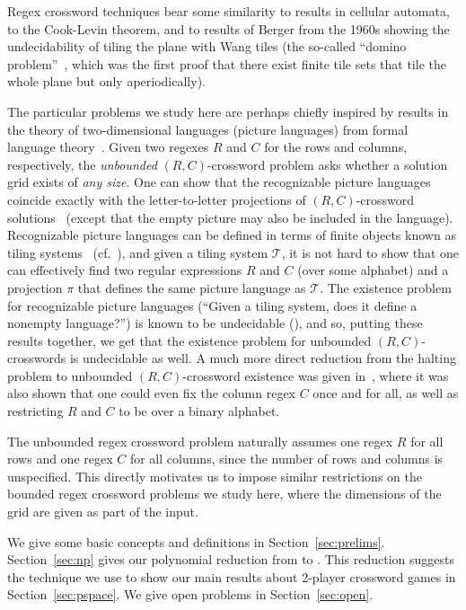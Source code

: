 \documentclass{article}
\newcommand{\0}{\mathbf{0}}
\newcommand{\1}{\mathbf{1}}
\newcommand{\2}{\mathbf{2}}
\newcounter{row}
\newcounter{col}
\theoremstyle{plain}
\theoremstyle{definition}
\begin{document}
Regex crossword techniques bear some similarity to results in cellular automata, to the Cook-Levin theorem, and to results of Berger from the 1960s showing the undecidability of tiling the plane with Wang tiles (the so-called ``domino problem''~\cite{Berger:domino-problem}, which was the first proof that there exist finite tile sets that tile the whole plane but only aperiodically).

The particular problems we study here are perhaps chiefly inspired by results in the theory of two-dimensional languages (picture languages) from formal language theory~\cite{GR:2d-languages}.  Given two regexes $R$ and $C$ for the rows and columns, respectively, the \emph{unbounded} $(R,C)$-crossword problem asks whether a solution grid exists of \emph{any size}.  One can show that the recognizable picture languages coincide exactly with the letter-to-letter projections of $(R,C)$-crossword solutions~\cite[Theorem~8.6]{GR:2d-languages} (except that the empty picture may also be included in the language).  Recognizable picture languages can be defined in terms of finite objects known as tiling systems~\cite{GR:rec-picture-languages} (cf.~\cite[Definition~7.2]{GR:2d-languages}), and given a tiling system $\mathcal{T}$, it is not hard to show that one can effectively find two regular expressions $R$ and $C$ (over some alphabet) and a projection $\pi$ that defines the same picture language as $\mathcal{T}$.  The existence problem for recognizable picture languages (``Given a tiling system, does it define a nonempty language?'') is known to be undecidable (\cite[Theorem~9.1]{GR:2d-languages}), and so, putting these results together, we get that the existence problem for unbounded $(R,C)$-crosswords is undecidable as well.  A much more direct reduction from the halting problem to unbounded $(R,C)$-crossword existence was given in~\cite{Fenner:regex-crossword}, where it was also shown that one could even fix the column regex $C$ once and for all, as well as restricting $R$ and $C$ to be over a binary alphabet.

The unbounded regex crossword problem naturally assumes one regex $R$ for all rows and one regex $C$ for all columns, since the number of rows and columns is unspecified.  This directly motivates us to impose similar restrictions on the bounded regex crossword problems we study here, where the dimensions of the grid are given as part of the input.

\bigskip

We give some basic concepts and definitions in Section~\ref{sec:prelims}.  Section~\ref{sec:np} gives our polynomial reduction from  to .  This reduction suggests the technique we use to show our main results about 2-player crossword games in Section~\ref{sec:pspace}.  We give open problems in Section~\ref{sec:open}.
\end{document}
